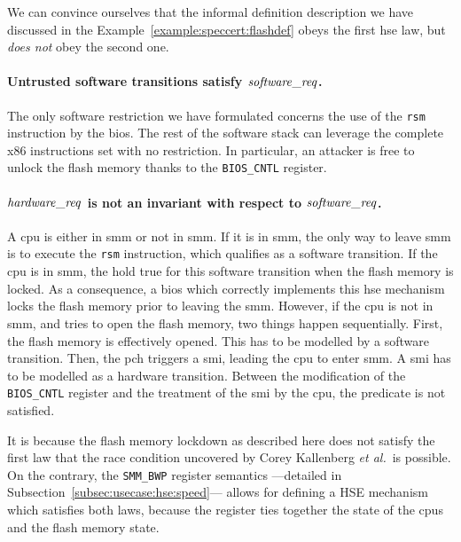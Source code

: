 \begin{example}
  We can convince ourselves that the informal definition description we have
  discussed in the Example~\ref{example:speccert:flashdef} obeys the first
  \ac{hse} law, but \emph{does not} obey the second one.
  \paragraph{Untrusted software transitions satisfy $\mathit{software\_req}$.}
  The only software restriction we have formulated concerns the use of the
  \texttt{rsm} instruction by the \ac{bios}.
  The rest of the software stack can leverage the complete x86 instructions set
  with no restriction.
  In particular, an attacker is free to unlock the flash memory thanks to the
  \texttt{BIOS\_CNTL} register.

  \paragraph{$\mathit{hardware\_req}$ is not an invariant with respect to
    $\mathit{software\_req}$.}
  A \ac{cpu} is either in \ac{smm} or not in \ac{smm}.
  If it is in \ac{smm}, the only way to leave \ac{smm} is to execute the
  \texttt{rsm} instruction, which qualifies as a software transition.
  If the \ac{cpu} is in \ac{smm}, the  hold true for this
  software transition when the flash memory is locked.
  As a consequence, a \ac{bios} which correctly implements this \ac{hse}
  mechanism locks the flash memory prior to leaving the \ac{smm}.
  However, if the \ac{cpu} is not in \ac{smm}, and tries to open the flash
  memory, two things happen sequentially.
  First, the flash memory is effectively opened.
  This has to be modelled by a software transition.
  Then, the \ac{pch} triggers a \ac{smi}, leading the \ac{cpu} to enter
  \ac{smm}.
  A \ac{smi} has to be modelled as a hardware transition.
  Between the modification of the \texttt{BIOS\_CNTL} register and the treatment
  of the \ac{smi} by the \ac{cpu}, the  predicate is not
  satisfied.

  It is because the flash memory lockdown as described here does not satisfy the
  first law that the race condition uncovered by Corey Kallenberg \emph{et
    al.}\,\cite{kallenberg2015racecondition} is possible.
  On the contrary, the \texttt{SMM\_BWP} register semantics ---detailed in
  Subsection~\ref{subsec:usecase:hse:speed}--- allows for defining a HSE
  mechanism which satisfies both laws, because the register ties together the
  state of the \acp{cpu} and the flash memory state.
\end{example}

